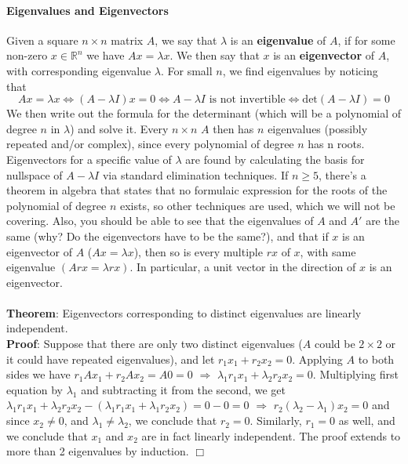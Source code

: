 \documentclass[12pt,oneside]{article}
\begin{document}
\paragraph{Eigenvalues and Eigenvectors}
Given a square $n \times n$ matrix $A$, we say that $\lambda$ is an
\textbf{eigenvalue} of $A$, if for some non-zero $x \in {\mathbb{R}}^n$
we have $Ax = \lambda x$. We then say that $x$ is an
\textbf{eigenvector} of $A$, with corresponding eigenvalue
$\lambda$. For small $n$, we find eigenvalues by noticing that $$Ax =
\lambda x \Longleftrightarrow (A - \lambda I)x = 0
\Longleftrightarrow A - \lambda I \text{ is not invertible}
\Longleftrightarrow \text{det}(A - \lambda I) = 0$$
We then write out the formula for the determinant (which will be a polynomial of degree $n$ in $\lambda$) and solve it. Every $n \times n$ $A$ then has $n$ eigenvalues (possibly repeated and/or complex), since every polynomial of degree $n$ has n roots. Eigenvectors for a specific value of $\lambda$ are found by calculating the basis for nullspace of $A - \lambda I$ via standard elimination techniques. If $n \geq 5$, there's a theorem in algebra that states that no formulaic expression for the roots of the polynomial of degree $n$ exists, so other techniques are used, which we will not be covering. Also, you should be able to see that the eigenvalues of $A$ and $A'$ are the same (why? Do the eigenvectors have to be the same?), and that if $x$ is an eigenvector of $A$ ($Ax = \lambda x$), then so is every multiple $r x$ of $x$, with same eigenvalue $(Arx = \lambda r x)$. In particular, a unit vector in the direction of $x$ is an eigenvector.
\\~\\
\textbf{Theorem}: Eigenvectors corresponding to distinct eigenvalues
are linearly independent.\\

\textbf{Proof}: Suppose that there are only two distinct
eigenvalues ($A$ could be $2 \times 2$ or it could have repeated
eigenvalues), and let $r_1 x_1 + r_2 x_2 = 0$. Applying $A$ to both
sides we have $r_1 Ax_1 + r_2 Ax_2 = A 0 = 0$ $\Longrightarrow$
$\lambda_1 r_1 x_1 + \lambda_2 r_2 x_2 = 0$. Multiplying first
equation by $\lambda_1$ and subtracting it from the second, we get
$\lambda_1 r_1 x_1 + \lambda_2 r_2 x_2 - (\lambda_1 r_1 x_1 + \lambda_1
r_2 x_2) = 0 - 0 = 0$ $\Longrightarrow$ $r_2 (\lambda_2 - \lambda_1)
x_2 = 0$ and since $x_2 \neq 0$, and $\lambda_1 \neq \lambda_2$, we
conclude that $r_2 = 0$. Similarly, $r_1 = 0$ as well, and we conclude
that $x_1$ and $x_2$ are in fact linearly independent. The proof
extends to more than 2 eigenvalues by induction. $\Box$
\\
\end{document}
